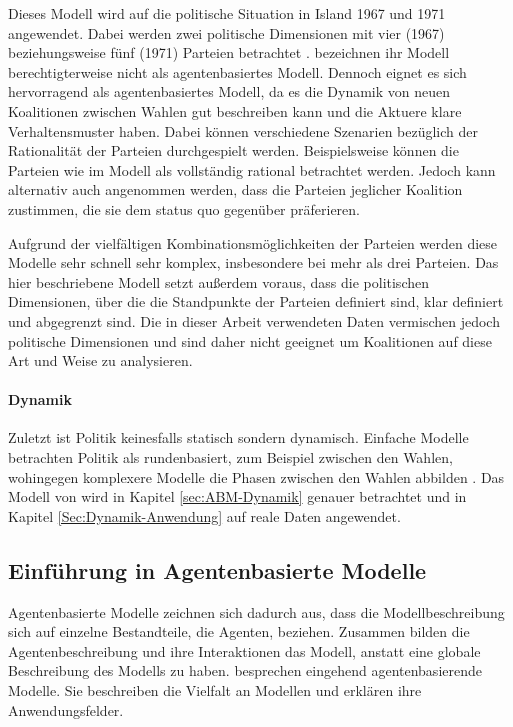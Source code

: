 Dieses Modell wird auf die politische Situation in Island 1967 und 1971 angewendet. Dabei werden zwei politische Dimensionen mit vier (1967) beziehungsweise fünf (1971) Parteien betrachtet \citep[S.\,882-5]{laver1990coalitions}. \citet{laver1990coalitions} bezeichnen ihr Modell berechtigterweise nicht als agentenbasiertes Modell. Dennoch eignet es sich hervorragend als agentenbasiertes Modell, da es die Dynamik von neuen Koalitionen zwischen Wahlen gut beschreiben kann und die Aktuere klare Verhaltensmuster haben. Dabei können verschiedene Szenarien bezüglich der Rationalität der Parteien durchgespielt werden. Beispielsweise können die Parteien wie im Modell als vollständig rational betrachtet werden. Jedoch kann alternativ auch angenommen werden, dass die Parteien jeglicher Koalition zustimmen, die sie dem status quo gegenüber präferieren.

Aufgrund der vielfältigen Kombinationsmöglichkeiten der Parteien werden diese Modelle sehr schnell sehr komplex, insbesondere bei mehr als drei Parteien. Das hier beschriebene Modell setzt außerdem voraus, dass die politischen Dimensionen, über die die Standpunkte der Parteien definiert sind, klar definiert und abgegrenzt sind. Die in dieser Arbeit verwendeten Daten vermischen jedoch politische Dimensionen und sind daher nicht geeignet um Koalitionen auf diese Art und Weise zu analysieren.

\paragraph{Dynamik}
Zuletzt ist Politik keinesfalls statisch sondern dynamisch. Einfache Modelle betrachten Politik als rundenbasiert, zum Beispiel zwischen den Wahlen, wohingegen komplexere Modelle die Phasen zwischen den Wahlen abbilden \citep[S.\,263-4]{laver2005policy}.
Das Modell von \citet{laver2005policy} wird in Kapitel \ref{sec:ABM-Dynamik} genauer betrachtet und in Kapitel \ref{Sec:Dynamik-Anwendung} auf reale Daten angewendet.

\subsection{Einführung in Agentenbasierte Modelle}

Agentenbasierte Modelle zeichnen sich dadurch aus, dass die Modellbeschreibung sich auf einzelne Bestandteile, die Agenten, beziehen. Zusammen bilden die Agentenbeschreibung und ihre Interaktionen das Modell, anstatt eine globale Beschreibung des Modells zu haben. \citet{marchi2014ABMs} besprechen eingehend agentenbasierende Modelle. Sie beschreiben die Vielfalt an Modellen und erklären ihre Anwendungsfelder.

